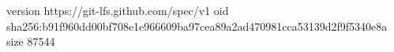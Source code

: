 version https://git-lfs.github.com/spec/v1
oid sha256:b91f960dd00bf708e1e966609ba97cea89a2ad470981cca53139d2f9f5340e8a
size 87544
